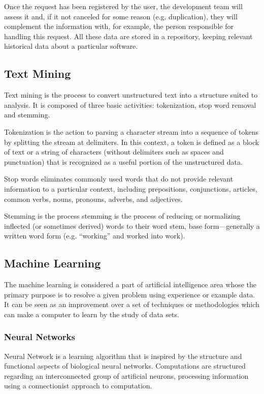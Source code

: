 \documentclass[10pt, conference]{IEEEtran}
\begin{document}
Once the request has been registered by the user, the development team will assess it and, if it not canceled for some reason (e.g. duplication), they will complement the information with, for example, the person responsible for handling this request. All these data are stored in a repository, keeping relevant historical data about a particular software.

\subsection{Text Mining}
Text mining is the process to convert unstructured text into a structure suited to analysis\cite{Feldman2007}. It is composed of three basic activities\cite{Williams2011}: tokenization, stop word removal and stemming.

Tokenization is the action to parsing a character stream into a sequence of tokens by splitting the stream at delimiters. In this context, a token is defined as a block of text or a string of characters (without delimiters such as spaces and punctuation) that is recognized as a useful portion of the unstructured data.

Stop words eliminates commonly used words that do not provide relevant information to a particular context, including prepositions, conjunctions, articles, common verbs, nouns, pronouns, adverbs, and adjectives.

Stemming is the process stemming is the process of reducing or normalizing inflected (or sometimes derived) words to their word stem, base form—generally a written word form (e.g. “working” and worked into work).

\subsection{Machine Learning}
The machine learning is considered a part of artificial intelligence area whose the primary purpose is to resolve a given problem using experience or example data\cite{Surya2016}. It can be seen as an improvement over a set of techniques or methodologies which can make a computer to learn by the study of data sets.

\subsubsection{Neural Networks}
Neural Network is a learning algorithm that is inspired by the structure and functional aspects of biological neural networks\cite{Russell2010}. Computations are structured regarding an interconnected group of artificial neurons, processing information using a connectionist approach to computation. 
\end{document}
